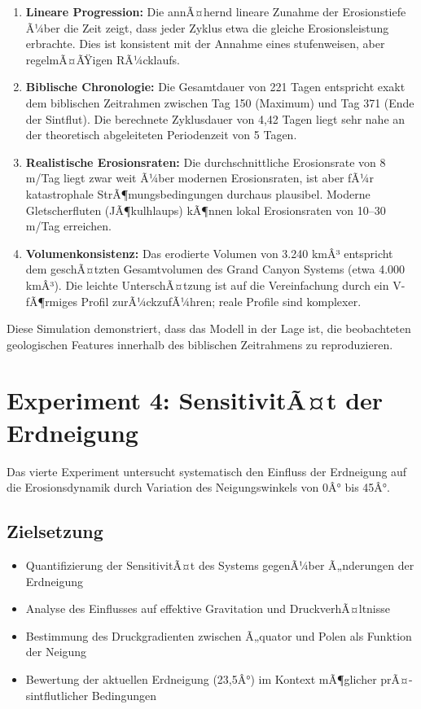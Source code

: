 ﻿\documentclass[12pt,a4paper]{report}
\begin{document}
\begin{enumerate}
	\item \textbf{Lineare Progression:} Die annÃ¤hernd lineare Zunahme der Erosionstiefe Ã¼ber die Zeit zeigt, dass jeder Zyklus etwa die gleiche Erosionsleistung erbrachte. Dies ist konsistent mit der Annahme eines stufenweisen, aber regelmÃ¤ÃŸigen RÃ¼cklaufs.
	
	\item \textbf{Biblische Chronologie:} Die Gesamtdauer von 221 Tagen entspricht exakt dem biblischen Zeitrahmen zwischen Tag 150 (Maximum) und Tag 371 (Ende der Sintflut). Die berechnete Zyklusdauer von 4,42 Tagen liegt sehr nahe an der theoretisch abgeleiteten Periodenzeit von 5 Tagen.
	
	\item \textbf{Realistische Erosionsraten:} Die durchschnittliche Erosionsrate von 8 m/Tag liegt zwar weit Ã¼ber modernen Erosionsraten, ist aber fÃ¼r katastrophale StrÃ¶mungsbeding\-ungen durchaus plausibel. Moderne Gletscherfluten (JÃ¶kulhlaups) kÃ¶nnen lokal Erosionsraten von 10--30 m/Tag erreichen.
	
	\item \textbf{Volumenkonsistenz:} Das erodierte Volumen von 3.240 kmÂ³ entspricht dem ge\-schÃ¤tz\-ten Gesamtvolumen des Grand Canyon Systems (etwa 4.000 kmÂ³). Die leichte UnterschÃ¤tzung ist auf die Vereinfachung durch ein V-fÃ¶rmiges Profil zurÃ¼ckzufÃ¼hren; reale Profile sind komplexer.
\end{enumerate}

Diese Simulation demonstriert, dass das Modell in der Lage ist, die beobachteten geologischen Features innerhalb des biblischen Zeitrahmens zu reproduzieren.

\section{Experiment 4: SensitivitÃ¤t der Erdneigung}

Das vierte Experiment untersucht systematisch den Einfluss der Erdneigung auf die Erosionsdynamik durch Variation des Neigungswinkels von 0Â° bis 45Â°.

\subsection{Zielsetzung}

\begin{itemize}
	\item Quantifizierung der SensitivitÃ¤t des Systems gegenÃ¼ber Ã„nderungen der Erdneigung
	\item Analyse des Einflusses auf effektive Gravitation und DruckverhÃ¤ltnisse
	\item Bestimmung des Druckgradienten zwischen Ã„quator und Polen als Funktion der Neigung
	\item Bewertung der aktuellen Erdneigung (23,5Â°) im Kontext mÃ¶glicher prÃ¤-sintflutlicher Bedingungen
\end{itemize}
\end{document}
